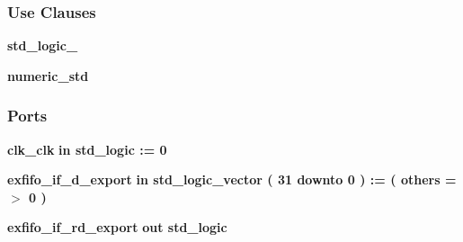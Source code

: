 \subsubsection*{Use Clauses}
 \begin{DoxyCompactItemize}
\item 
{\bf std\+\_\+logic\+\_}   
\item 
{\bf numeric\+\_\+std}   
\end{DoxyCompactItemize}
\subsubsection*{Ports}
 \begin{DoxyCompactItemize}
\item 
{\bf clk\+\_\+clk}  {\bfseries {\bfseries \textcolor{keywordflow}{in}\textcolor{vhdlchar}{ }}} {\bfseries \textcolor{comment}{std\+\_\+logic}\textcolor{vhdlchar}{ }\textcolor{vhdlchar}{ }\textcolor{vhdlchar}{\+:}\textcolor{vhdlchar}{=}\textcolor{vhdlchar}{ }\textcolor{vhdlchar}{ }\textcolor{vhdlchar}{\textquotesingle{}}\textcolor{vhdlchar}{ } \textcolor{vhdldigit}{0} \textcolor{vhdlchar}{ }\textcolor{vhdlchar}{\textquotesingle{}}\textcolor{vhdlchar}{ }} 
\item 
{\bf exfifo\+\_\+if\+\_\+d\+\_\+export}  {\bfseries {\bfseries \textcolor{keywordflow}{in}\textcolor{vhdlchar}{ }}} {\bfseries \textcolor{comment}{std\+\_\+logic\+\_\+vector}\textcolor{vhdlchar}{ }\textcolor{vhdlchar}{(}\textcolor{vhdlchar}{ }\textcolor{vhdlchar}{ } \textcolor{vhdldigit}{31} \textcolor{vhdlchar}{ }\textcolor{keywordflow}{downto}\textcolor{vhdlchar}{ }\textcolor{vhdlchar}{ } \textcolor{vhdldigit}{0} \textcolor{vhdlchar}{ }\textcolor{vhdlchar}{)}\textcolor{vhdlchar}{ }\textcolor{vhdlchar}{ }\textcolor{vhdlchar}{ }\textcolor{vhdlchar}{\+:}\textcolor{vhdlchar}{=}\textcolor{vhdlchar}{ }\textcolor{vhdlchar}{(}\textcolor{vhdlchar}{ }\textcolor{vhdlchar}{ }\textcolor{keywordflow}{others}\textcolor{vhdlchar}{ }\textcolor{vhdlchar}{ }\textcolor{vhdlchar}{=}\textcolor{vhdlchar}{ }\textcolor{vhdlchar}{$>$}\textcolor{vhdlchar}{ }\textcolor{vhdlchar}{\textquotesingle{}}\textcolor{vhdlchar}{ } \textcolor{vhdldigit}{0} \textcolor{vhdlchar}{ }\textcolor{vhdlchar}{\textquotesingle{}}\textcolor{vhdlchar}{ }\textcolor{vhdlchar}{)}\textcolor{vhdlchar}{ }} 
\item 
{\bf exfifo\+\_\+if\+\_\+rd\+\_\+export}  {\bfseries {\bfseries \textcolor{keywordflow}{out}\textcolor{vhdlchar}{ }}} {\bfseries \textcolor{comment}{std\+\_\+logic}\textcolor{vhdlchar}{ }} 
\item 

\end{DoxyCompactItemize}
